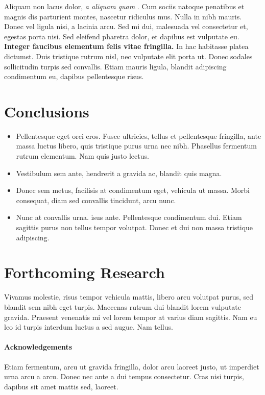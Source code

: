 \documentclass[12pt,a4paper]{article}\def\nCols{1}
\begin{document}
Aliquam non lacus dolor, \textit{a aliquam quam} \cite{Smith:2012qr}. Cum sociis natoque penatibus et magnis dis parturient montes, nascetur ridiculus mus. Nulla in nibh mauris. Donec vel ligula nisi, a lacinia arcu. Sed mi dui, malesuada vel consectetur et, egestas porta nisi. Sed eleifend pharetra dolor, et dapibus est vulputate eu. \textbf{Integer faucibus elementum felis vitae fringilla.} In hac habitasse platea dictumst. Duis tristique rutrum nisl, nec vulputate elit porta ut. Donec sodales sollicitudin turpis sed convallis. Etiam mauris ligula, blandit adipiscing condimentum eu, dapibus pellentesque risus.





\section{Conclusions}
\begin{itemize}
\item Pellentesque eget orci eros. Fusce ultricies, tellus et pellentesque fringilla, ante massa luctus libero, quis tristique purus urna nec nibh. Phasellus fermentum rutrum elementum. Nam quis justo lectus.
\item Vestibulum sem ante, hendrerit a gravida ac, blandit quis magna.
\item Donec sem metus, facilisis at condimentum eget, vehicula ut massa. Morbi consequat, diam sed convallis tincidunt, arcu nunc.
\item Nunc at convallis urna. isus ante. Pellentesque condimentum dui. Etiam sagittis purus non tellus tempor volutpat. Donec et dui non massa tristique adipiscing.
\end{itemize}







\section{Forthcoming Research}
Vivamus molestie, risus tempor vehicula mattis, libero arcu volutpat purus, sed blandit sem nibh eget turpis. Maecenas rutrum dui blandit lorem vulputate gravida. Praesent venenatis mi vel lorem tempor at varius diam sagittis. Nam eu leo id turpis interdum luctus a sed augue. Nam tellus.

 
 
 

\printbibliography %




\paragraph{Acknowledgements}
Etiam fermentum, arcu ut gravida fringilla, dolor arcu laoreet justo, ut imperdiet urna arcu a arcu. Donec nec ante a dui tempus consectetur. Cras nisi turpis, dapibus sit amet mattis sed, laoreet.
\end{document}
